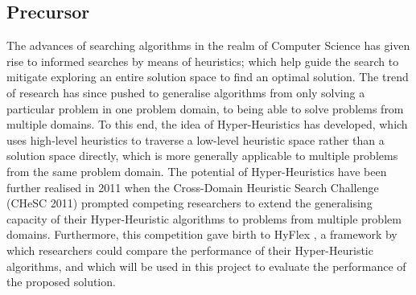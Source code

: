 \documentclass[a4paper,12pt]{article}
\begin{document}
    \subsection{Precursor}
        \par{
            \noindent
            The advances of searching algorithms in the realm of Computer Science has
            given rise to informed searches by means of heuristics; which help guide the
            search to mitigate exploring an entire solution space to find an optimal solution. 
            The trend of research has since pushed to generalise algorithms from only
            solving a particular problem in one problem domain, to being able to solve
            problems from multiple domains.\newline 
            \newline 
            To this end, the idea of Hyper-Heuristics has developed, which uses high-level 
            heuristics to traverse a low-level heuristic space rather than a solution space 
            directly, which is more generally applicable to multiple problems from the same 
            problem domain.\newline 
            \newline 
            The potential of Hyper-Heuristics have been further realised in 2011 when the
            Cross-Domain Heuristic Search Challenge (CHeSC 2011) \cite{chesc} prompted competing
            researchers to extend the generalising capacity of their Hyper-Heuristic 
            algorithms to problems from multiple problem domains. Furthermore, this competition gave 
            birth to HyFlex \cite{hyflex2012}, a framework by which researchers could compare
            the performance of their Hyper-Heuristic algorithms, and which will be used in
            this project to evaluate the performance of the proposed solution. 
        }
\end{document}
